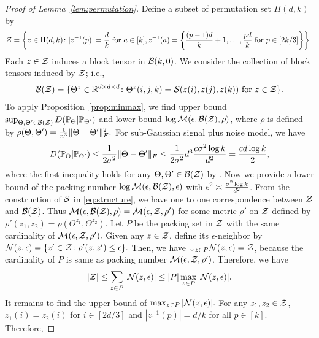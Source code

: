 \documentclass[11pt]{article}
\theoremstyle{definition}
\begin{document}
\begin{proof}[Proof of Lemma~\ref{lem:permutation}]
Define a subset of permutation set $\Pi(d,k)$ by
\begin{align}
    \mathcal{Z} = \left\{z\in \Pi(d,k)\colon |z^{-1}(p)| = \frac{d}{k} \text{ for } a\in[k], z^{-1}(a) = \left\{\frac{(p-1)d}{k}+1,\ldots,\frac{pd}{k} \text{ for } p\in[2k/3]\right\}\right\}.
\end{align}
Each $z\in\mathcal{Z}$ induces a block tensor in $\mathcal{B}(k,0)$. We consider the collection of block tensors induced by $\mathcal{Z}$; i.e.,
\begin{align}
    \mathcal{B}(\mathcal{Z}) = \{\Theta^z\in\mathbb{R}^{d\times d\times d}\colon \Theta^z(i,j,k) = \mathcal{S}(z(i),z(j),z(k)) \text{ for } z\in\mathcal{Z}\}.
\end{align}
To apply Proposition~\ref{prop:minmax}, we find upper bound $\sup_{\Theta,\Theta'\in\mathcal{B}(\mathcal{Z})}D(\mathbb{P}_\Theta|\mathbb{P}_{\Theta'})$ and lower bound $\log \mathcal{M}(\epsilon,\mathcal{B}(\mathcal{Z}),\rho)$, where $\rho$ is defined by 
$\rho(\Theta,\Theta') = \frac{1}{n^3}\lVert\Theta-\Theta'\rVert_F^2.$
For sub-Gaussian signal plus noise model, we have
\begin{align}\label{eq:kldistance}
    D(\mathbb{P}_\Theta|\mathbb{P}_{\Theta'})\leq \frac{1}{2\sigma^2}\lVert\Theta-\Theta'\rVert_F\leq \frac{1}{2\sigma^2}d^3 \frac{c\sigma^2\log k}{d^2}=\frac{cd\log k}{2},
\end{align}where the first inequality holds for any $\Theta,\Theta'\in\mathcal{B}(\mathcal{Z})$ by \citet[Proposition 4.2]{gao2015rate}. Now we provide a lower bound of the packing number $\log \mathcal{M}(\epsilon,\mathcal{B}(\mathcal{Z}),\epsilon)$ with $\epsilon^2 \asymp {\sigma^2\log k \over d^2}$. From the construction of $\mathcal{S}$ in \eqref{eq:structure}, we have one to one correspondence between $\mathcal{Z}$ and $\mathcal{B}(\mathcal{Z})$. Thus $\mathcal{M}(\epsilon,\mathcal{B}(\mathcal{Z}),\rho) = \mathcal{M}(\epsilon,\mathcal{Z},\rho')$ for some metric $\rho'$ on $\mathcal{Z}$ defined by $\rho'(z_1,z_2) = \rho(\Theta^{z_1},\Theta^{z_2})$. Let $P$ be the packing set in $\mathcal{Z}$ with the same cardinality of $\mathcal{M}(\epsilon,\mathcal{Z},\rho').$ Given any $z\in\mathcal{Z}$, define its $\epsilon$-neighbor by $\mathcal{N}(z,\epsilon) = \{z'\in\mathcal{Z}\colon \rho'(z,z')\leq \epsilon\}.$ Then, we have $\cup_{z\in P} \mathcal{N}(z,\epsilon) = \mathcal{Z}$, because the cardinality of $P$ is same as packing number $\mathcal{M}(\epsilon,\mathcal{Z},\rho')$. Therefore, we have
\begin{align}\label{eq:packing}
    |\mathcal{Z}|\leq\sum_{z\in P}|\mathcal{N}(z,\epsilon)|\leq |P|\max_{z\in P}|\mathcal{N}(z,\epsilon)|.
\end{align}
It remains to find the upper bound of $\max_{z\in P}|\mathcal{N}(z,\epsilon)|.$ For any $z_1,z_2\in\mathcal{Z}$, $z_1(i) = z_2(i)$ for $i\in[2d/3]$ and $|z_1^{-1}(p)| = d/k$ for all $p\in[k].$ Therefore,

\end{proof}
\end{document}
